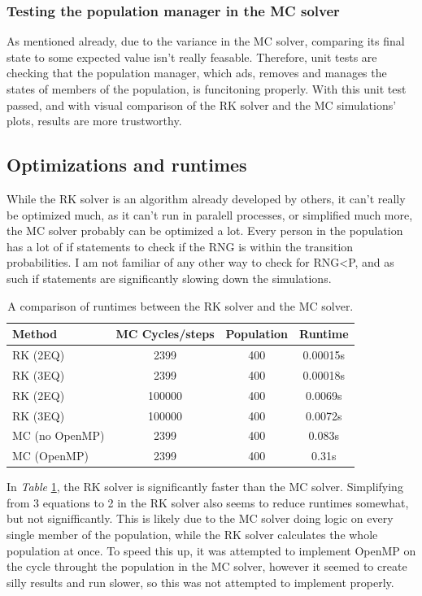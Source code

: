 \subsubsection{Testing the population manager in the MC solver}
As mentioned already, due to the variance in the MC solver, comparing its final state to some expected value isn't really feasable.
Therefore, unit tests are checking that the population manager, which ads, removes and manages the states of members of the population, is funcitoning properly.
With this unit test passed, and with visual comparison of the RK solver and the MC simulations' plots, results are more trustworthy.



\subsection{Optimizations and runtimes}
While the RK solver is an algorithm already developed by others, it can't really be optimized much, as it can't run in paralell processes, or simplified much more,
the MC solver probably can be optimized a lot. Every person in the population has a lot of if statements to check if the RNG is within the transition probabilities.
I am not familiar of any other way to check for RNG<P, and as such if statements are significantly slowing down the simulations.

\begin{table}
    \centering 
    \begin{tabular}{l|c|c|c}
        Method & MC Cycles/steps & Population & Runtime \\
        \hline
        RK (2EQ) & 2399 & 400 & 0.00015s \\
        RK (3EQ)   &2399 &400 & 0.00018s \\
        RK (2EQ) & 100000 & 400 & 0.0069s \\
        RK (3EQ) & 100000 & 400 & 0.0072s \\
        MC (no OpenMP) & 2399 & 400 & 0.083s \\
        MC (OpenMP) & 2399 & 400 & 0.31s
    \end{tabular}
    \caption{A comparison of runtimes between the RK solver and the MC solver.}
    \label{tab:single_runtimes}
\end{table}

In \textit{Table} \ref{tab:single_runtimes}, the RK solver is significantly faster than the MC solver.
Simplifying from 3 equations to 2 in the RK solver also seems to reduce runtimes somewhat, but not signifficantly.
This is likely due to the MC solver doing logic on every single member of the population, while the RK solver calculates the whole population at once.
To speed this up, it was attempted to implement OpenMP on the cycle throught the population in the MC solver, however it seemed to create silly results and run slower, so this was not attempted to implement properly.


